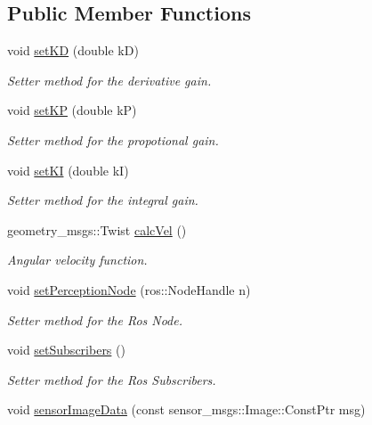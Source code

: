 \subsection*{Public Member Functions}
\begin{DoxyCompactItemize}
\item 
void \hyperlink{classTurtlebotPerception_aad31358d5ee035f5f948943508e58a43}{set\+KD} (double kD)
\begin{DoxyCompactList}\small\item\em Setter method for the derivative gain. \end{DoxyCompactList}\item 
void \hyperlink{classTurtlebotPerception_a25b85524dc8671c4560dcafd44ded89c}{set\+KP} (double kP)
\begin{DoxyCompactList}\small\item\em Setter method for the propotional gain. \end{DoxyCompactList}\item 
void \hyperlink{classTurtlebotPerception_a026f0e2a818a2f8a5959fc7825af2a11}{set\+KI} (double kI)
\begin{DoxyCompactList}\small\item\em Setter method for the integral gain. \end{DoxyCompactList}\item 
geometry\+\_\+msgs\+::\+Twist \hyperlink{classTurtlebotPerception_af8626b9948ab26c7637914a8a3b269a3}{calc\+Vel} ()
\begin{DoxyCompactList}\small\item\em Angular velocity function. \end{DoxyCompactList}\item 
void \hyperlink{classTurtlebotPerception_a0e516c98e39e292f03039f6abf156306}{set\+Perception\+Node} (ros\+::\+Node\+Handle n)
\begin{DoxyCompactList}\small\item\em Setter method for the Ros Node. \end{DoxyCompactList}\item 
void \hyperlink{classTurtlebotPerception_a6488f8f1f4f33efcbdceda9d975b9122}{set\+Subscribers} ()
\begin{DoxyCompactList}\small\item\em Setter method for the Ros Subscribers. \end{DoxyCompactList}\item 
void \hyperlink{classTurtlebotPerception_a9c6a0052da899680aef285d9ac746782}{sensor\+Image\+Data} (const sensor\+\_\+msgs\+::\+Image\+::\+Const\+Ptr msg)

\end{DoxyCompactItemize}
